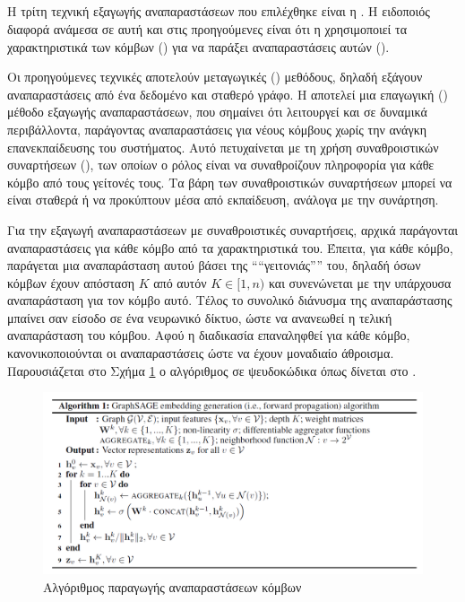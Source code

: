 \subsection{} \label{gsage}

Η τρίτη τεχνική εξαγωγής αναπαραστάσεων που επιλέχθηκε είναι η 
\cite{GraphSAGE}. Η ειδοποιός διαφορά ανάμεσα σε αυτή και στις προηγούμενες
είναι ότι η  χρησιμοποιεί τα χαρακτηριστικά των κόμβων ()
για να παράξει αναπαραστάσεις αυτών ().

Οι προηγούμενες τεχνικές αποτελούν μεταγωγικές () μεθόδους, δηλαδή εξάγουν
αναπαραστάσεις από ένα δεδομένο και σταθερό γράφο. Η  αποτελεί μια επαγωγική
() μέθοδο εξαγωγής αναπαραστάσεων, που σημαίνει ότι λειτουργεί και σε δυναμικά
περιβάλλοντα, παράγοντας αναπαραστάσεις για νέους κόμβους χωρίς την ανάγκη επανεκπαίδευσης
του συστήματος. Αυτό πετυχαίνεται με τη χρήση συναθροιστικών συναρτήσεων 
(), των οποίων ο ρόλος είναι να συναθροίζουν πληροφορία για κάθε
κόμβο από τους γείτονές τους. Τα βάρη των συναθροιστικών συναρτήσεων μπορεί να είναι 
σταθερά ή να προκύπτουν μέσα από εκπαίδευση, ανάλογα με την συνάρτηση.

Για την εξαγωγή αναπαραστάσεων με συναθροιστικές συναρτήσεις, αρχικά παράγονται
αναπαραστάσεις για κάθε κόμβο από τα χαρακτηριστικά του. Έπειτα, για κάθε κόμβο, παράγεται
μια αναπαράσταση αυτού βάσει της ````γειτονιάς'''' του, δηλαδή όσων κόμβων έχουν απόσταση \(K\)
από αυτόν \(K \in [1,n)\) και συνενώνεται με την υπάρχουσα αναπαράσταση για τον κόμβο αυτό.
Τέλος το συνολικό διάνυσμα της αναπαράστασης μπαίνει σαν είσοδο σε ένα νευρωνικό δίκτυο,
ώστε να ανανεωθεί η τελική αναπαράσταση του κόμβου. Αφού η διαδικασία επαναληφθεί για κάθε
κόμβο, κανονικοποιούνται οι αναπαραστάσεις ώστε να έχουν μοναδιαίο άθροισμα.
Παρουσιάζεται στο Σχήμα \ref{figure1.8} ο αλγόριθμος σε ψευδοκώδικα όπως δίνεται στο
\cite{GraphSAGE}.

\begin{figure}[!ht] \centering
\includegraphics[scale = 0.5]{static/figures/GSAGE_algo.png} 
\caption{Αλγόριθμος   παραγωγής  αναπαραστάσεων κόμβων \cite{GraphSAGE}}
\label{figure1.8}
\end{figure}

